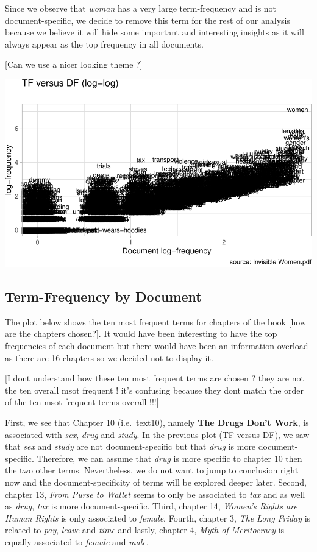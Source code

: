 \documentclass[
]{article}
\begin{document}
Since we observe that \emph{woman} has a very large term-frequency and
is not document-specific, we decide to remove this term for the rest of
our analysis because we believe it will hide some important and
interesting insights as it will always appear as the top frequency in
all documents.

{[}Can we use a nicer looking theme ?{]}

\begin{center}\includegraphics[width=0.7\linewidth]{report_files/figure-latex/TF vs DF-1} \end{center}

\hypertarget{term-frequency-by-document}{%
\subsection{Term-Frequency by
Document}\label{term-frequency-by-document}}

The plot below shows the ten most frequent terms for chapters of the
book {[}how are the chapters chosen?{]}. It would have been interesting
to have the top frequencies of each document but there would have been
an information overload as there are 16 chapters so we decided not to
display it.

{[}I dont understand how these ten most frequent terms are chosen ? they
are not the ten overall msot frequent ! it's confusing because they dont
match the order of the ten msot frequent terms overall !!!{]}

First, we see that Chapter 10 (i.e.~text10), namely \textbf{The Drugs
Don't Work}, is associated with \emph{sex}, \emph{drug} and
\emph{study}. In the previous plot (TF versus DF), we saw that
\emph{sex} and \emph{study} are not document-specific but that
\emph{drug} is more document-specific. Therefore, we can assume that
\emph{drug} is more specific to chapter 10 then the two other terms.
Nevertheless, we do not want to jump to conclusion right now and the
document-specificity of terms will be explored deeper later. Second,
chapter 13, \emph{From Purse to Wallet} seems to only be associated to
\emph{tax} and as well as \emph{drug}, \emph{tax} is more
document-specific. Third, chapter 14, \emph{Women's Rights are Human
Rights} is only associated to \emph{female}. Fourth, chapter 3,
\emph{The Long Friday} is related to \emph{pay}, \emph{leave} and
\emph{time} and lastly, chapter 4, \emph{Myth of Meritocracy} is equally
associated to \emph{female} and \emph{male}.
\end{document}

